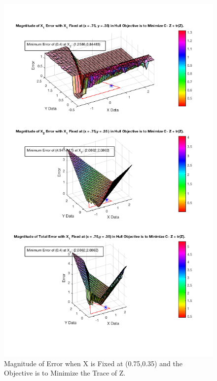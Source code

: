 \documentclass[answers]{exam}
\begin{document}
        \begin{figure}[H]
    \centering
    
        \caption{Magnitude of Error when X is Fixed at (0.75,0.35) and the Objective is to Minimize the Trace of Z.}
    \includegraphics[scale=.7]{Problem8f2.png}
    \end{figure} 
    
\end{document}
